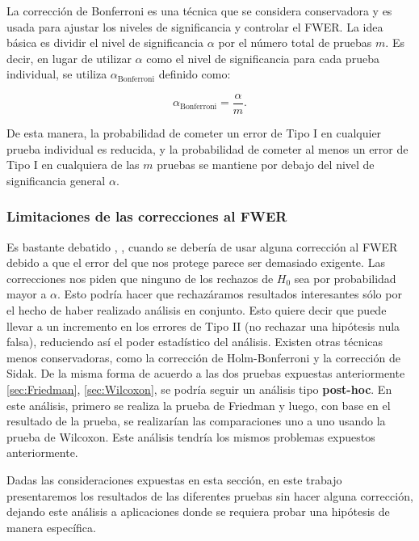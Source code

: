 La corrección de Bonferroni es una técnica que se considera conservadora y es usada  para ajustar los niveles de significancia y controlar el FWER. La idea básica es dividir el nivel de significancia $\alpha$ por el número total de pruebas $m$. Es decir, en lugar de utilizar $\alpha$ como el nivel de significancia para cada prueba individual, se utiliza $\alpha_{\text{Bonferroni}}$ definido como:

\begin{equation} \label{eq:Bonferroni}
\alpha_{\text{Bonferroni}} = \frac{\alpha}{m}.
\end{equation}

De esta manera, la probabilidad de cometer un error de Tipo I en cualquier prueba individual es reducida, y la probabilidad de cometer al menos un error de Tipo I en cualquiera de las $m$ pruebas se mantiene por debajo del nivel de significancia general $\alpha$.


\subsubsection{Limitaciones de las correcciones al FWER}

Es bastante debatido \cite{pernegerWhatWrongBonferroni1998}, \cite{nakagawaFarewellBonferroniProblems2004}, \cite{goemanMultipleHypothesisTesting2014}  cuando se debería de usar alguna corrección al FWER debido a que el error del que nos protege parece ser demasiado exigente. Las correcciones nos piden que ninguno de los rechazos de $H_0$ sea por probabilidad mayor a $\alpha$. Esto podría hacer que rechazáramos resultados interesantes sólo por el hecho de haber realizado análisis en conjunto. Esto quiere decir que puede llevar a un incremento en los errores de Tipo II (no rechazar una hipótesis nula falsa), reduciendo así el poder estadístico del análisis. Existen otras técnicas menos conservadoras, como la corrección de Holm-Bonferroni y la corrección de Sidak. De la misma forma de acuerdo a las dos pruebas expuestas anteriormente \ref{sec:Friedman}, \ref{sec:Wilcoxon}, se podría seguir un análisis tipo \textbf{post-hoc}. En este análisis, primero se realiza la prueba de Friedman y luego, con base en el resultado de la prueba, se realizarían las comparaciones uno a uno usando la prueba de Wilcoxon. Este análisis tendría los mismos problemas expuestos anteriormente.

Dadas las consideraciones expuestas en esta sección, en este trabajo presentaremos los resultados de las diferentes pruebas sin hacer alguna corrección, dejando este análisis a aplicaciones donde se requiera probar una hipótesis de manera específica.  




